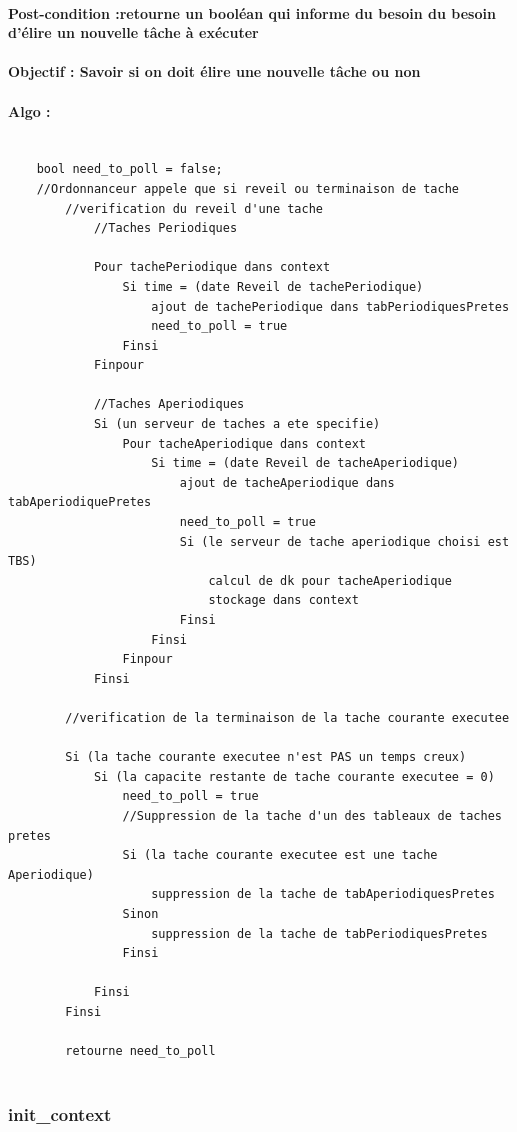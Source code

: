 				\paragraph{Post-condition :retourne un booléan qui informe du besoin du besoin d'élire un nouvelle tâche à exécuter} 
				\paragraph{Objectif : Savoir si on doit élire une nouvelle tâche ou non} 
				\paragraph{Algo :} 
					\begin{lstlisting}
					
	bool need_to_poll = false;
	//Ordonnanceur appele que si reveil ou terminaison de tache
		//verification du reveil d'une tache
			//Taches Periodiques
			
			Pour tachePeriodique dans context
				Si time = (date Reveil de tachePeriodique)
					ajout de tachePeriodique dans tabPeriodiquesPretes
					need_to_poll = true
				Finsi
			Finpour
			
			//Taches Aperiodiques
			Si (un serveur de taches a ete specifie) 
				Pour tacheAperiodique dans context
					Si time = (date Reveil de tacheAperiodique)
						ajout de tacheAperiodique dans tabAperiodiquePretes
						need_to_poll = true
						Si (le serveur de tache aperiodique choisi est TBS)
							calcul de dk pour tacheAperiodique
							stockage dans context
						Finsi
					Finsi
				Finpour
			Finsi
			
		//verification de la terminaison de la tache courante executee
		
		Si (la tache courante executee n'est PAS un temps creux)
			Si (la capacite restante de tache courante executee = 0)
				need_to_poll = true
				//Suppression de la tache d'un des tableaux de taches pretes
				Si (la tache courante executee est une tache Aperiodique)
					suppression de la tache de tabAperiodiquesPretes
				Sinon
					suppression de la tache de tabPeriodiquesPretes
				Finsi
		
			Finsi
		Finsi
		
		retourne need_to_poll
				
					\end{lstlisting}
				
			\subsubsection{init\_context}
